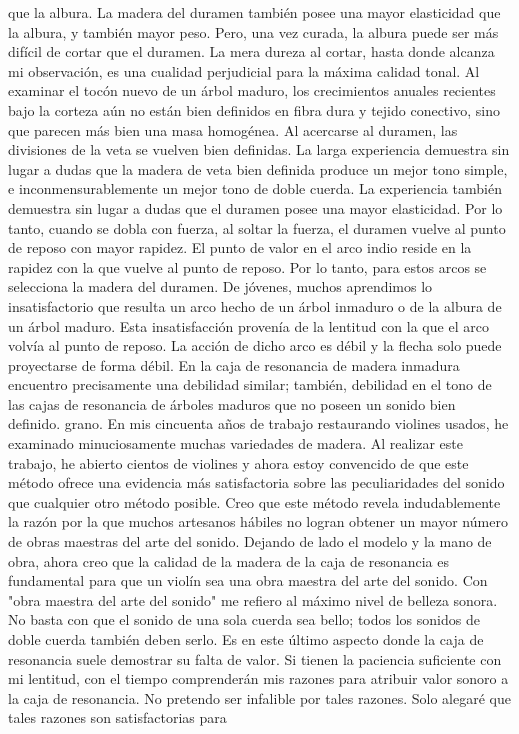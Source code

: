 que la albura. La madera del duramen también posee una mayor elasticidad que la albura, y también mayor peso. Pero, una vez curada, la albura puede ser más difícil de cortar que el duramen. La mera dureza al cortar, hasta donde alcanza mi observación, es una cualidad perjudicial para la máxima calidad tonal. Al examinar el tocón nuevo de un árbol maduro, los crecimientos anuales recientes bajo la corteza aún no están bien definidos en fibra dura y tejido conectivo, sino que parecen más bien una masa homogénea. Al acercarse al duramen, las divisiones de la veta se vuelven bien definidas. La larga experiencia demuestra sin lugar a dudas que la madera de veta bien definida produce un mejor tono simple, e inconmensurablemente un mejor tono de doble cuerda. La experiencia también demuestra sin lugar a dudas que el duramen posee una mayor elasticidad. Por lo tanto, cuando se dobla con fuerza, al soltar la fuerza, el duramen vuelve al punto de reposo con mayor rapidez. El punto de valor en el arco indio reside en la rapidez con la que vuelve al punto de reposo. Por lo tanto, para estos arcos se selecciona la madera del duramen. De jóvenes, muchos aprendimos lo insatisfactorio que resulta un arco hecho de un árbol inmaduro o de la albura de un árbol maduro. Esta insatisfacción provenía de la lentitud con la que el arco volvía al punto de reposo. La acción de dicho arco es débil y la flecha solo puede proyectarse de forma débil. En la caja de resonancia de madera inmadura encuentro precisamente una debilidad similar; también, debilidad en el tono de las cajas de resonancia de árboles maduros que no poseen un sonido bien definido.
grano.
En mis cincuenta años de trabajo restaurando violines usados, he examinado minuciosamente muchas variedades de madera. Al realizar este trabajo, he abierto cientos de violines y ahora estoy convencido de que este método ofrece una evidencia más satisfactoria sobre las peculiaridades del sonido que cualquier otro método posible. Creo que este método revela indudablemente la razón por la que muchos artesanos hábiles no logran obtener un mayor número de obras maestras del arte del sonido. Dejando de lado el modelo y la mano de obra, ahora creo que la calidad de la madera de la caja de resonancia es fundamental para que un violín sea una obra maestra del arte del sonido. Con "obra maestra del arte del sonido" me refiero al máximo nivel de belleza sonora. No basta con que el sonido de una sola cuerda sea bello; todos los sonidos de doble cuerda también deben serlo. Es en este último aspecto donde la caja de resonancia suele demostrar su falta de valor. Si tienen la paciencia suficiente con mi lentitud, con el tiempo comprenderán mis razones para atribuir valor sonoro a la caja de resonancia. No pretendo ser infalible por tales razones. Solo alegaré que tales razones son satisfactorias para
